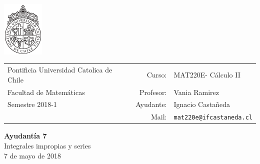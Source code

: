 \documentclass[12pt]{article}
\makeatletter
\newcommand{\ayudantia}{{\sc Ayudantía 7}}
\newcommand{\tituloayu}{Integrales impropias y series}
\newcommand{\fecha}{7 de mayo de 2018}
\newcommand{\sigla}{MAT220E}
\newcommand{\nombre}{Cálculo II}
\newcommand{\profesor}{Vania Ramirez}
\newcommand{\ano}{2018}
\newcommand{\semestre}{1}
\newcommand{\mail}{mat220e@ifcastaneda.cl}
\makeatother
\begin{document}
\thispagestyle{empty}

\begin{minipage}{2cm}
	\includegraphics[width=2cm]{../../../../img/logo.pdf}
	\vspace{0.5cm}
\end{minipage}
\begin{minipage}{\linewidth}
	\begin{tabular}{lrl}
		{\scriptsize\sc Pontificia Universidad Catolica de Chile} & \hspace*{0.7in}Curso: &
		\sigla  - \nombre\\
		{\sc Facultad de Matemáticas}&
		Profesor: & \profesor \\
		{\sc Semestre \ano-\semestre} & Ayudante: & {Ignacio Castañeda}\\
		& {Mail:} & \texttt{\mail}
	\end{tabular}
\end{minipage}

\vspace{-10mm}
\begin{center}
	{\LARGE\bf \ayudantia}\\
	\vspace{0.1cm}
	{\tituloayu}\\
	\vspace{0.1cm}
	\fecha\\
	\vspace{0.4cm}
\end{center}
\end{document}
